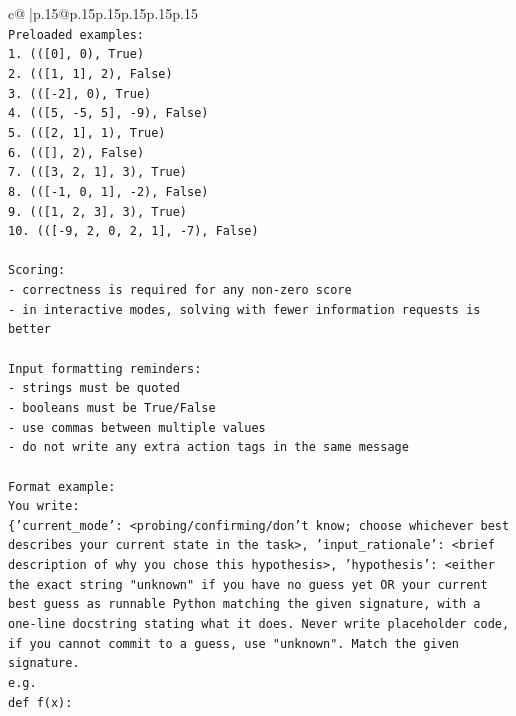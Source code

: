\documentclass{article}
\begin{document}
{\begin{supertabular}{c@{$\;$}|p{.15\linewidth}@{}p{.15\linewidth}p{.15\linewidth}p{.15\linewidth}p{.15\linewidth}p{.15\linewidth}}
{{{\\ 
\texttt{Preloaded examples:} \\
\texttt{1. (({[}0{]}, 0), True)} \\
\texttt{2. (({[}1, 1{]}, 2), False)} \\
\texttt{3. (({[}{-}2{]}, 0), True)} \\
\texttt{4. (({[}5, {-}5, 5{]}, {-}9), False)} \\
\texttt{5. (({[}2, 1{]}, 1), True)} \\
\texttt{6. (({[}{]}, 2), False)} \\
\texttt{7. (({[}3, 2, 1{]}, 3), True)} \\
\texttt{8. (({[}{-}1, 0, 1{]}, {-}2), False)} \\
\texttt{9. (({[}1, 2, 3{]}, 3), True)} \\
\texttt{10. (({[}{-}9, 2, 0, 2, 1{]}, {-}7), False)} \\
\\ 
\texttt{Scoring:} \\
\texttt{{-} correctness is required for any non{-}zero score} \\
\texttt{{-} in interactive modes, solving with fewer information requests is better} \\
\\ 
\texttt{Input formatting reminders:} \\
\texttt{{-} strings must be quoted} \\
\texttt{{-} booleans must be True/False} \\
\texttt{{-} use commas between multiple values} \\
\texttt{{-} do not write any extra action tags in the same message} \\
\\ 
\texttt{Format example:} \\
\texttt{You write:} \\
\texttt{\{'current\_mode': <probing/confirming/don't know; choose whichever best describes your current state in the task>, 'input\_rationale': <brief description of why you chose this hypothesis>, 'hypothesis': <either the exact string "unknown" if you have no guess yet OR your current best guess as runnable Python matching the given signature, with a one{-}line docstring stating what it does. Never write placeholder code, if you cannot commit to a guess, use "unknown". Match the given signature.} \\
\texttt{e.g.} \\
\texttt{def f(x):} \\
}}}
\end{supertabular}}
\end{document}
